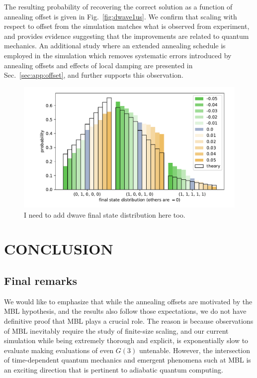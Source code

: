 \documentclass[prd,twocolumn,tightenlines,preprintnumbers,showpacs,superscriptaddress,notitlepage,nofootinbib,eqsecnum,floatfix,longbibliography,aps,10pt]{revtex4-2}
\begin{document}
The resulting probability of recovering the correct solution as a function of annealing offset is given in Fig.~\ref{fig:dwave1us}.
We confirm that scaling with respect to offset from the simulation matches what is observed from experiment, and provides evidence suggesting that the improvements are related to quantum mechanics.
An additional study where an extended annealing schedule is employed in the simulation which removes systematic errors introduced by annealing offsets and effects of local damping are presented in Sec.~\ref{sec:app:offset}, and further supports this observation.

\begin{figure}
	\centering
	\includegraphics[width=\columnwidth]{./new_figures/final_state_distribution.pdf}
	\caption{{\color{red}I need to add dwave final state distribution here too.}}
	\label{fig:final_state_distribution}
\end{figure}



\section{CONCLUSION}
\label{sec:conclusion}


\subsection{Final remarks}
\label{sec:results:final}
We would like to emphasize that while the annealing offsets are motivated by the MBL hypothesis, and the results also follow those expectations, we do not have definitive proof that MBL plays a crucial role.
The reason is because observations of MBL inevitably require the study of finite-size scaling, and our current simulation while being extremely thorough and explicit, is exponentially slow to evaluate making evaluations of even $G(3)$ untenable.
However, the intersection of time-dependent quantum mechanics and emergent phenomena such at MBL is an exciting direction that is pertinent to adiabatic quantum computing.
\end{document}
